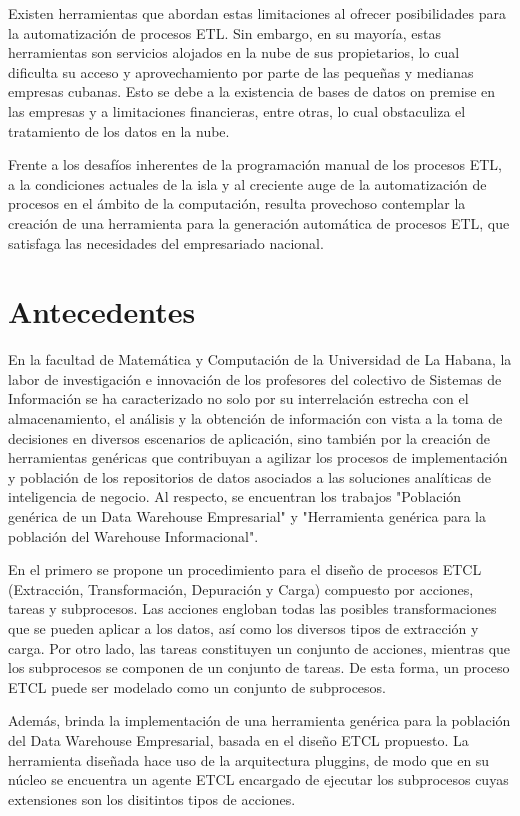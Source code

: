 Existen herramientas que abordan estas limitaciones al ofrecer posibilidades para la automatización de procesos ETL. 
Sin embargo, en su mayoría, estas herramientas son servicios alojados en la nube de sus propietarios, lo cual 
dificulta su acceso y aprovechamiento por parte de las pequeñas y medianas empresas cubanas. Esto se debe a la 
existencia de bases de datos on premise en las empresas y a limitaciones financieras, entre otras, lo cual 
obstaculiza el tratamiento de los datos en la nube.

Frente a los desafíos inherentes de la programaci\'on manual de los procesos ETL, a la condiciones actuales
de la isla y al creciente auge de la automatización de procesos en el ámbito de la computación, resulta 
provechoso contemplar la creación de una herramienta para la generación automática de procesos ETL, que satisfaga 
las necesidades del empresariado nacional.

\section{Antecedentes}

En la facultad de Matemática y Computación de la Universidad de La Habana, la labor de investigación e innovación de 
los profesores del colectivo de Sistemas de Información se ha caracterizado no solo por su interrelación estrecha 
con el almacenamiento, el análisis y la obtención de información con vista a la toma de decisiones en diversos 
escenarios de aplicación, sino también por la creación de herramientas genéricas que contribuyan a agilizar los 
procesos de implementación y población de los repositorios de datos asociados a las soluciones analíticas de 
inteligencia de negocio. Al respecto, se encuentran los trabajos "Población genérica
de un Data Warehouse Empresarial"\cite{mijailmaster} y "Herramienta genérica para la población del 
Warehouse Informacional"\cite{lismaster}.

En el primero se propone un procedimiento para el diseño de procesos ETCL
(Extracci\'on, Transformaci\'on, Depuraci\'on y Carga) compuesto por acciones, tareas y subprocesos. 
Las acciones engloban todas las posibles transformaciones que se pueden 
aplicar a los datos, así como los diversos tipos de extracción y carga. Por otro lado, las tareas constituyen un 
conjunto de acciones, mientras que los subprocesos se componen de un conjunto de tareas. De esta forma, un proceso 
ETCL puede ser modelado como un conjunto de subprocesos.

Además, brinda la implementación de una herramienta genérica para la población del Data Warehouse Empresarial, basada en el 
diseño ETCL propuesto. La herramienta diseñada hace uso de la arquitectura pluggins\cite{noauthor_plug-architectures_nodate}, 
de modo que en su n\'ucleo se encuentra 
un agente ETCL encargado de ejecutar los subprocesos cuyas extensiones son los disitintos tipos de acciones.

